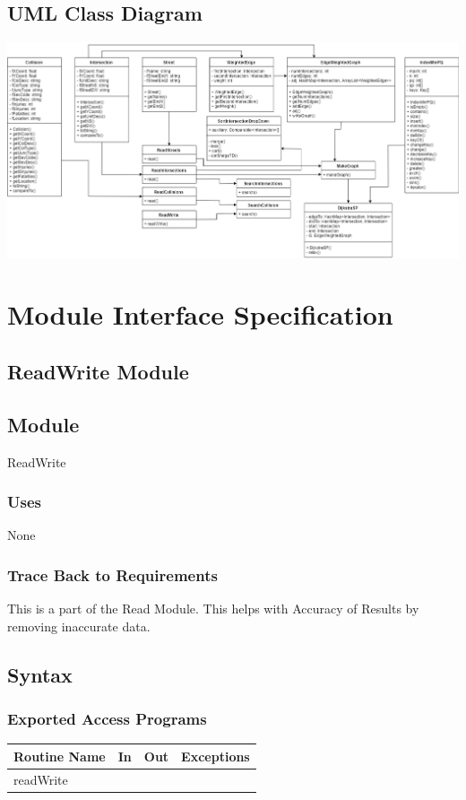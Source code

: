 \documentclass[12pt]{article}
\begin{document}
    \subsection{UML Class Diagram}
    \begin{center}
        \includegraphics[angle=270, scale=0.4]{UML_Class_Diagram.png}
    \end{center}

\newpage
\section{Module Interface Specification}
\subsection{ReadWrite Module}
\subsection*{Module}
ReadWrite

\subsubsection*{Uses}
None

\subsubsection*{Trace Back to Requirements}
This is a part of the Read Module. This helps with Accuracy of Results by removing inaccurate data.

\subsection*{Syntax}
\subsubsection*{Exported Access Programs}
    \begin{tabular}{|l|l|l|l|}
    \hline
    \textbf{Routine Name} & \textbf{In} & \textbf{Out} & \textbf{Exceptions}\\
    \hline
    readWrite & ~ & ~ & ~\\
    \hline
    \end{tabular}
    
\end{document}
